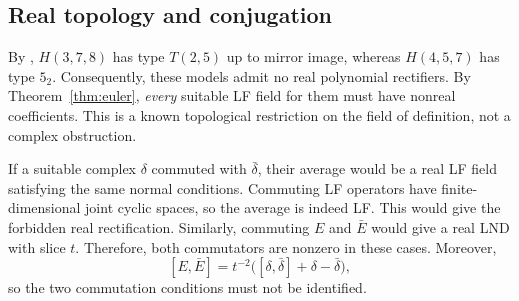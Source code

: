 \subsection{Real topology and conjugation}
By \cite[p.~2, Fig.~3]{KP}, $H(3,7,8)$ has type $T(2,5)$
up to mirror image, whereas $H(4,5,7)$ has type $5_2$.
Consequently, these models admit no real polynomial rectifiers.
By Theorem~\ref{thm:euler}, \emph{every} suitable LF field for them
must have nonreal coefficients. This is a known topological
restriction on the field of definition, not a complex obstruction.

If a suitable complex $\delta$ commuted with $\bar\delta$,
their average would be a real LF field satisfying the same normal
conditions. Commuting LF operators have finite-dimensional joint
cyclic spaces, so the average is indeed LF.
This would give the forbidden real rectification. Similarly,
commuting $E$ and $\bar E$ would give a real LND with slice $t$.
Therefore, both commutators are nonzero in these cases. Moreover,
\[
[E,\bar E]=t^{-2}\bigl([\delta,\bar\delta]+\delta-\bar\delta\bigr),
\]
so the two commutation conditions must not be identified.
